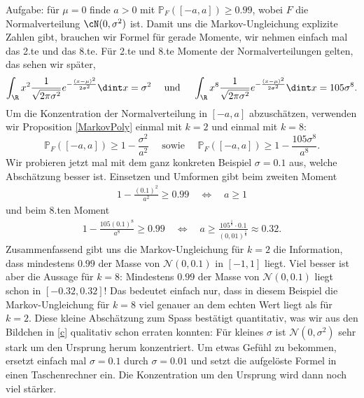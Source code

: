 \begin{anwendung}
	Aufgabe: für $\mu = 0$ finde $a > 0$ mit $\mathbb{P}_F([-a,a]) \geq 0.99$, wobei $F$ die Normalverteilung $\cN(0, \sigma^2)$ ist. Damit uns die Markov-Ungleichung explizite Zahlen gibt, brauchen wir Formel f\"ur gerade Momente, wir nehmen einfach mal das 2.te und das 8.te. F\"ur 2.te und 8.te Momente der Normalverteilungen gelten, das sehen wir sp\"ater, 
	\[ \int_{\R} x^2 \frac{1}{\sqrt{2 \pi \sigma^2}}  e^{-\frac{(x-\mu)^2}{2\sigma^2}} \dint x = \sigma^2\quad \text{ und }\quad \int_{\R} x^8 \frac{1}{\sqrt{2 \pi \sigma^2}}  e^{-\frac{(x-\mu)^2}{2\sigma^2}} \dint x = 105 \sigma^8. \]
	Um die Konzentration der Normalverteilung in $[-a,a]$ abzusch\"atzen, verwenden wir Proposition \ref{MarkovPoly} einmal mit $k=2$ und einmal mit $k=8$:
	\[ \mathbb{P}_F([-a,a]) \geq 1 - \frac{\sigma^2}{a^2}\quad \text{ sowie }\quad \mathbb{P}_F([-a,a]) \geq 1 - \frac{105\sigma^8}{a^8}. \]
	Wir probieren jetzt mal mit dem ganz konkreten Beispiel $\sigma=0.1$ aus, welche Absch\"atzung besser ist. Einsetzen und Umformen gibt beim zweiten Moment
	\begin{align*}
		1 - \frac{(0.1)^2}{a^2} \geq  0.99\quad \Leftrightarrow \quad a \geq 1
	\end{align*}
	und beim 8.ten Moment
	\begin{align*}
		1 - \frac{105(0.1)^8}{a^8} \geq 0.99\quad \Leftrightarrow\quad  a \geq \frac{105^{\frac{1}{8}} \cdot 0.1}{(0,01)^{\frac{1}{8}}} \approx 0.32.
	\end{align*}
	Zusammenfassend gibt uns die Markov-Ungleichung f\"ur $k=2$ die Information, dass mindestens $0.99$ der Masse von $\mathcal N(0,0.1)$ in $[-1,1]$ liegt. Viel besser ist aber die Aussage f\"ur $k=8$: Mindestens $0.99$ der Masse von $\mathcal N(0,0.1)$ liegt schon in $[-0.32,0.32]$! Das bedeutet einfach nur, dass in diesem Beispiel die Markov-Ungleichung f\"ur $k=8$ viel genauer an dem echten Wert liegt als f\"ur $k=2$. Diese kleine Absch\"atzung zum Spass best\"atigt quantitativ, was wir aus den Bildchen in \ref{c} qualitativ schon erraten konnten: F\"ur kleines $\sigma$ ist $\mathcal N(0,\sigma^2)$ sehr stark um den Ursprung herum konzentriert. Um etwas Gef\"uhl zu bekommen, ersetzt einfach mal $\sigma=0.1$ durch $\sigma=0.01$ und setzt die aufgel\"oste Formel in einen Taschenrechner ein. Die Konzentration um den Ursprung wird dann noch viel st\"arker.
\end{anwendung}